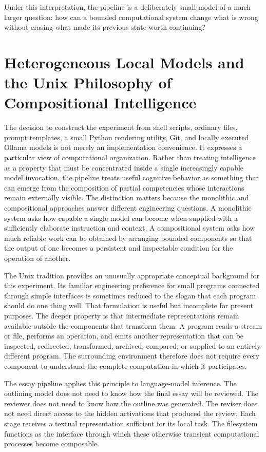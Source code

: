\documentclass[11pt]{article}
\begin{document}
Under this interpretation, the pipeline is a deliberately small model of a much larger question: how can a bounded computational system change what is wrong without erasing what made its previous state worth continuing?

\section{Heterogeneous Local Models and the Unix Philosophy of Compositional Intelligence}

The decision to construct the experiment from shell scripts, ordinary files, prompt templates, a small Python rendering utility, Git, and locally executed Ollama models is not merely an implementation convenience. It expresses a particular view of computational organization. Rather than treating intelligence as a property that must be concentrated inside a single increasingly capable model invocation, the pipeline treats useful cognitive behavior as something that can emerge from the composition of partial competencies whose interactions remain externally visible. The distinction matters because the monolithic and compositional approaches answer different engineering questions. A monolithic system asks how capable a single model can become when supplied with a sufficiently elaborate instruction and context. A compositional system asks how much reliable work can be obtained by arranging bounded components so that the output of one becomes a persistent and inspectable condition for the operation of another.

The Unix tradition provides an unusually appropriate conceptual background for this experiment. Its familiar engineering preference for small programs connected through simple interfaces is sometimes reduced to the slogan that each program should do one thing well. That formulation is useful but incomplete for present purposes. The deeper property is that intermediate representations remain available outside the components that transform them. A program reads a stream or file, performs an operation, and emits another representation that can be inspected, redirected, transformed, archived, compared, or supplied to an entirely different program. The surrounding environment therefore does not require every component to understand the complete computation in which it participates.

The essay pipeline applies this principle to language-model inference. The outlining model does not need to know how the final essay will be reviewed. The reviewer does not need to know how the outline was generated. The reviser does not need direct access to the hidden activations that produced the review. Each stage receives a textual representation sufficient for its local task. The filesystem functions as the interface through which these otherwise transient computational processes become composable.
\end{document}
